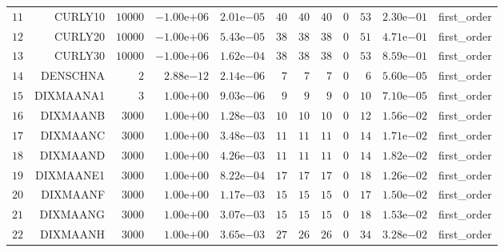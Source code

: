 \begin{longtable}{rrrrrrrrrrrr}
  \(    11\) & CURLY10 & \( 10000\) & \(-1.00\)e\(+06\) & \( 2.01\)e\(-05\) & \(    40\) & \(    40\) & \(    40\) & \(     0\) & \(    53\) & \( 2.30\)e\(-01\) & first\_order \\
  \(    12\) & CURLY20 & \( 10000\) & \(-1.00\)e\(+06\) & \( 5.43\)e\(-05\) & \(    38\) & \(    38\) & \(    38\) & \(     0\) & \(    51\) & \( 4.71\)e\(-01\) & first\_order \\
  \(    13\) & CURLY30 & \( 10000\) & \(-1.00\)e\(+06\) & \( 1.62\)e\(-04\) & \(    38\) & \(    38\) & \(    38\) & \(     0\) & \(    53\) & \( 8.59\)e\(-01\) & first\_order \\
  \(    14\) & DENSCHNA & \(     2\) & \( 2.88\)e\(-12\) & \( 2.14\)e\(-06\) & \(     7\) & \(     7\) & \(     7\) & \(     0\) & \(     6\) & \( 5.60\)e\(-05\) & first\_order \\
  \(    15\) & DIXMAANA1 & \(     3\) & \( 1.00\)e\(+00\) & \( 9.03\)e\(-06\) & \(     9\) & \(     9\) & \(     9\) & \(     0\) & \(    10\) & \( 7.10\)e\(-05\) & first\_order \\
  \(    16\) & DIXMAANB & \(  3000\) & \( 1.00\)e\(+00\) & \( 1.28\)e\(-03\) & \(    10\) & \(    10\) & \(    10\) & \(     0\) & \(    12\) & \( 1.56\)e\(-02\) & first\_order \\
  \(    17\) & DIXMAANC & \(  3000\) & \( 1.00\)e\(+00\) & \( 3.48\)e\(-03\) & \(    11\) & \(    11\) & \(    11\) & \(     0\) & \(    14\) & \( 1.71\)e\(-02\) & first\_order \\
  \(    18\) & DIXMAAND & \(  3000\) & \( 1.00\)e\(+00\) & \( 4.26\)e\(-03\) & \(    11\) & \(    11\) & \(    11\) & \(     0\) & \(    14\) & \( 1.82\)e\(-02\) & first\_order \\
  \(    19\) & DIXMAANE1 & \(  3000\) & \( 1.00\)e\(+00\) & \( 8.22\)e\(-04\) & \(    17\) & \(    17\) & \(    17\) & \(     0\) & \(    18\) & \( 1.26\)e\(-02\) & first\_order \\
  \(    20\) & DIXMAANF & \(  3000\) & \( 1.00\)e\(+00\) & \( 1.17\)e\(-03\) & \(    15\) & \(    15\) & \(    15\) & \(     0\) & \(    17\) & \( 1.50\)e\(-02\) & first\_order \\
  \(    21\) & DIXMAANG & \(  3000\) & \( 1.00\)e\(+00\) & \( 3.07\)e\(-03\) & \(    15\) & \(    15\) & \(    15\) & \(     0\) & \(    18\) & \( 1.53\)e\(-02\) & first\_order \\
  \(    22\) & DIXMAANH & \(  3000\) & \( 1.00\)e\(+00\) & \( 3.65\)e\(-03\) & \(    27\) & \(    26\) & \(    26\) & \(     0\) & \(    34\) & \( 3.28\)e\(-02\) & first\_order \\

\end{longtable}
